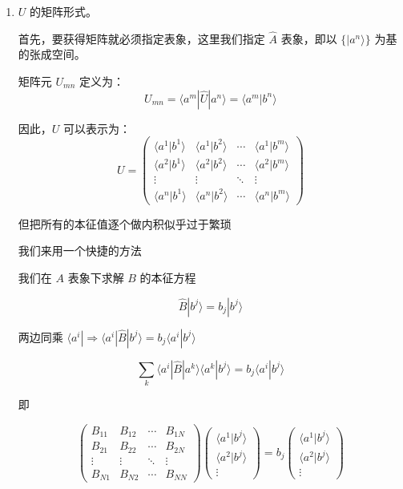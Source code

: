 \documentclass[lang=cn,10pt]{elegantbook}
\begin{document}
\begin{enumerate}
	\item $U$ 的矩阵形式。
	
	首先，要获得矩阵就必须指定表象，这里我们指定 $\hat{A}$ 表象，即以 $\{ |a^n\rangle \}$ 为基的张成空间。
	
	矩阵元 $U_{mn}$ 定义为：
	\[
	U_{mn} = \langle a^m | \hat{U} | a^n \rangle = \langle a^m | b^n \rangle
	\]
	
	因此，$U$ 可以表示为：
	\[
	U = \begin{pmatrix}
		\langle a^1 | b^1 \rangle & \langle a^1 | b^2 \rangle & \cdots & \langle a^1 | b^m \rangle \\
		\langle a^2 | b^1 \rangle & \langle a^2 | b^2 \rangle & \cdots & \langle a^2 | b^m \rangle \\
		\vdots & \vdots & \ddots & \vdots \\
		\langle a^n | b^1 \rangle & \langle a^n | b^2 \rangle & \cdots & \langle a^n | b^m \rangle
	\end{pmatrix}
	\]
	
	但把所有的本征值逐个做内积似乎过于繁琐
	
	我们来用一个快捷的方法
	
		我们在 $A$ 表象下求解 $B$ 的本征方程
	
	\[
	\hat{B} | b^{j} \rangle = b_j | b^{j} \rangle
	\]
	
		两边同乘 $\langle a^{i} | \Rightarrow \langle a^{i} | \hat{B} | b^{j} \rangle = b_j \langle a^{i} | b^{j} \rangle$
	
	\[
	\sum_k \langle a^{i} | \hat{B} | a^{k} \rangle \langle a^{k} | b^{j} \rangle = b_j \langle a^{i} | b^{j} \rangle
	\]
	
	即
	
	\[
	\begin{pmatrix}
		B_{11} & B_{12} & \cdots & B_{1N} \\
		B_{21} & B_{22} & \cdots & B_{2N} \\
		\vdots & \vdots & \ddots & \vdots \\
		B_{N1} & B_{N2} & \cdots & B_{NN}
	\end{pmatrix}
	\begin{pmatrix}
		\langle a^{1} | b^{j} \rangle \\
		\langle a^{2} | b^{j} \rangle \\
		\vdots
	\end{pmatrix}
	=
	b_j
	\begin{pmatrix}
		\langle a^{1} | b^{j} \rangle \\
		\langle a^{2} | b^{j} \rangle \\
		\vdots
	\end{pmatrix}
	\]
	

\end{enumerate}
\end{document}
